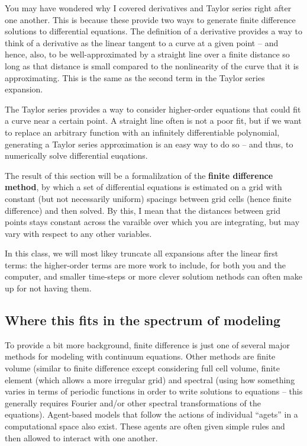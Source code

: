 \documentclass[a4paper,10pt]{scrartcl}
\begin{document}
You may have wondered why I covered derivatives and Taylor series right after one another. This is because these provide two ways to generate finite difference solutions to differential equations. The definition of a derivative provides a way to think of a derivative as the linear tangent to a curve at a given point -- and hence, also, to be well-approximated by a straight line over a finite distance so long as that distance is small compared to the nonlinearity of the curve that it is approximating. This is the same as the second term in the Taylor series expansion.

The Taylor series provides a way to consider higher-order equations that could fit a curve near a certain point. A straight line often is not a poor fit, but if we want to replace an arbitrary function with an infinitely differentiable polynomial, generating a Taylor series approximation is an easy way to do so -- and thus, to numerically solve differential euqations.

The result of this section will be a formalilzation of the \textbf{finite difference method}, by which a set of differential equations is estimated on a grid with constant (but not necessarily uniform) spacings between grid cells (hence finite difference) and then solved. By this, I mean that the distances between grid points stays constant across the varaible over which you are integrating, but may vary with respect to any other variables.

In this class, we will most likey truncate all expansions after the linear first terms: the higher-order terms are more work to include, for both you and the computer, and smaller time-steps or more clever solutiom nethods can often make up for not having them.

\subsection{Where this fits in the spectrum of modeling}

To provide a bit more background, finite difference is just one of several major methods for modeling with continuum equations. Other methods are finite volume (similar to finite difference except considering full cell volume, finite element (which allows a more irregular grid) and spectral (using how something varies in terms of periodic functions in order to write solutions to equations -- this generally requires Fourier and/or other spectral transformations of the equations). Agent-based models that follow the actions of individual ``agets'' in a computational space also exist. These agents are often given simple rules and then allowed to interact with one another.
\end{document}
